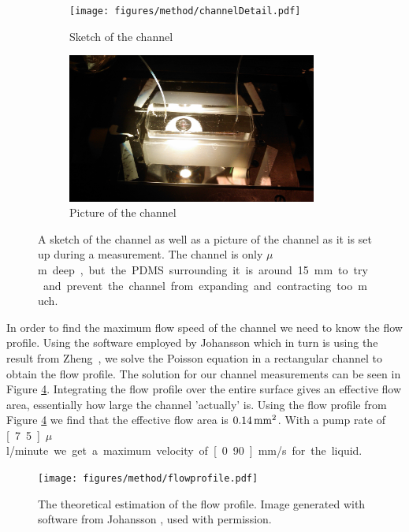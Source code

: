 \begin{figure}[H]
\centering
\begin{subfigure}[b]{0.45\textwidth}
\texttt{[image: figures/method/channelDetail.pdf]}
\caption{Sketch of the channel}\label{fig:channelsketch}
\end{subfigure}
\begin{subfigure}[b]{0.45\textwidth}
\includegraphics[width=0.9\textwidth]{figures/method/ChannelZoomed.jpg}
\caption{Picture of the channel}\label{fig:channelpicture}
\end{subfigure}
\caption{A sketch of the channel as well as a picture of the channel as it is set up during a measurement. The channel is only \unit[150]{$\mu$m} deep, but the PDMS surrounding it is around 15 mm to try and prevent the channel from expanding and contracting too much.}
\label{fig:channel}
\end{figure}

In order to find the maximum flow speed of the channel we need to know the flow profile. Using the software employed by Johansson \cite{AntonThesis} which in turn is using the result from Zheng~\cite{flowprofile}, we solve the Poisson equation in a rectangular channel to obtain the flow profile. The solution for our channel measurements can be seen in Figure \ref{fig:flowprofile}. 
Integrating the flow profile over the entire surface gives an effective flow area, essentially how large the channel 'actually' is. 
Using the flow profile from Figure \ref{fig:flowprofile} we find that the effective flow area is $\unit[0.14]{mm^2}$. With a pump rate of \unit[7.5]{$\mu$l/minute} we get a maximum velocity of \unit[0.90]{mm/s} for the liquid.



\begin{figure}[H]
\begin{center}
\texttt{[image: figures/method/flowprofile.pdf]}
\end{center}
\caption{The theoretical estimation of the flow profile. Image generated with software from Johansson \cite{AntonThesis}, used with permission.}
\label{fig:flowprofile}
\end{figure}

